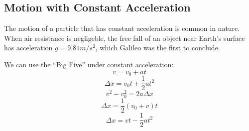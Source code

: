 \documentclass[11pt,a4paper]{report}
\begin{document}
\subsection*{Motion with Constant Acceleration}

The motion of a particle that has constant acceleration is common in nature. When air resistance is negligeble, the free fall of an object near Earth's surface has acceleration $g=9.81 m/s^{2}$, which Galileo was the first to conclude.

\noindent
We can use the ``Big Five'' under constant acceleration:
$$v=v_{0}+at$$
$$\Delta{x}=v_{0}t+\frac{1}{2}at^{2}$$
$$v^{2}-v^{2}_{0}=2a\Delta{x}$$
$$\Delta{x}=\frac{1}{2}\left(v_{0}+v\right)t$$
$$\Delta{x}=vt-\frac{1}{2}at^{2}$$
\end{document}
